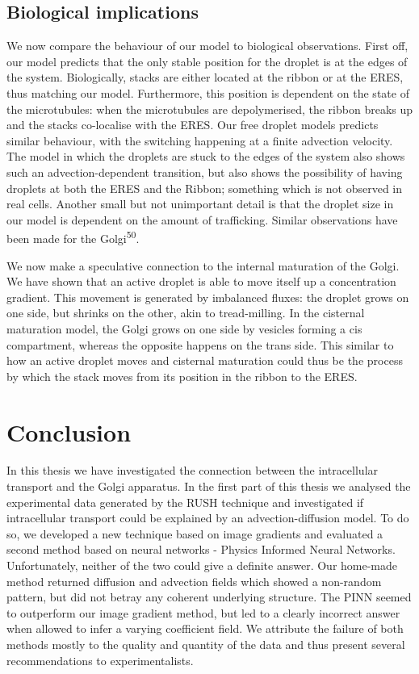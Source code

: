 \documentclass{Dissertate}
\begin{document}
\hypertarget{biological-implications}{%
\section{Biological implications}\label{biological-implications}}

We now compare the behaviour of our model to biological observations. First
off, our model predicts that the only stable position for the droplet is
at the edges of the system. Biologically, stacks are either located at
the ribbon or at the ERES, thus matching our model. Furthermore, this
position is dependent on the state of the microtubules: when the microtubules are depolymerised, the ribbon breaks up and the stacks co-localise with the
ERES. Our free droplet models predicts similar behaviour, with the
switching happening at a finite advection velocity. The model in which the droplets are stuck to the edges of the system also shows such an advection-dependent transition, but also shows the possibility of having droplets at both the ERES and the Ribbon; something which is not observed in real cells. Another small but not unimportant detail is that the 
droplet size in our model is dependent on the amount of trafficking. Similar observations have been made for the Golgi\textsuperscript{50}.

We now make a speculative connection to the internal maturation of the Golgi.  We have shown that an active droplet is able to move itself up a concentration gradient. This movement is generated by imbalanced fluxes: the droplet grows on one side, but shrinks on the other, akin to tread-milling. In the cisternal maturation model, the Golgi grows on one side by vesicles forming a cis compartment, whereas the opposite happens on the trans side. This similar to how an active droplet moves and cisternal maturation could thus be the process by which the stack moves from its position in the ribbon to the ERES.



\hypertarget{conclusion-1}{%
\chapter{Conclusion}\label{conclusion-1}}

In this thesis we have investigated the connection between the intracellular transport and the Golgi apparatus. In the first part of this thesis we analysed the experimental data generated by the RUSH technique and investigated if intracellular transport could be explained by an advection-diffusion model. To do so, we developed a new technique based on image gradients and evaluated a second method based on neural networks - Physics Informed Neural Networks. Unfortunately, neither of the two could give a definite answer. Our home-made method returned diffusion and advection fields which showed a non-random pattern, but did not betray any coherent underlying structure. The PINN seemed to outperform our image gradient method, but led to a clearly incorrect answer when allowed to infer a varying coefficient field. We attribute the failure of both methods mostly to the quality and quantity of the data and thus present several recommendations to experimentalists. 
\end{document}
